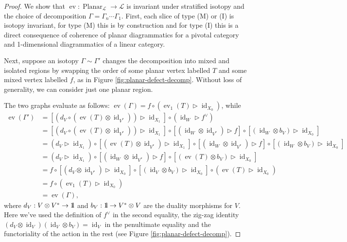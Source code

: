 \documentclass[a4paper]{article}
\numberwithin{equation}{section}
\newcommand{\idty}{{\mathrm{1}\mkern-4mu{\mathchoice{}{}{\mskip-0.5mu}{\mskip-1mu}}\mathrm{l}}}
\newcommand{\1}{{\mathrm{1}\mkern-4mu{\mathchoice{}{}{\mskip-0.5mu}{\mskip-1mu}}\mathrm{l}}}
\DeclareMathOperator{\ev}{ev}
\renewcommand{\L}{\mathcal{L}}
\DeclareMathOperator{\id}{id}
\DeclareMathOperator{\Planar}{Planar} %
\begin{document}
\begin{proof}
   We show that $\ev : \Planar_\L \to \L$ is invariant under stratified isotopy and the choice of decomposition $\Gamma = \Gamma_n \cdots \Gamma_1$. 
First, each slice of type (M) or (I) is isotopy invariant, for type (M) this is by construction and for type (I) this is a direct consequence of coherence of planar diagrammatics for a pivotal category and 1-dimensional diagrammatics of a linear category.

Next, suppose an isotopy $\Gamma \sim \Gamma'$ changes the decomposition into mixed and isolated regions by swapping the order of some planar vertex labelled $T$ and some mixed vertex labelled $f$, as in Figure \ref{fig:planar-defect-decomp}. Without loss of generality, we can consider just one planar region.

The two graphs evaluate as follows: $\ev(\Gamma) = f\circ\left(\ev_1(T)\triangleright \id_{X_0}\right)$, while
\begin{equation}
\begin{aligned}
  \ev(\Gamma') &= [(d_V\circ (\ev(T)\otimes \id_{V^*})) \triangleright \id_{X_1}] \circ (\id_{W}\triangleright f^\vee) \\
  &= [(d_V\circ(\ev(T)\otimes\id_{V^*}))\triangleright\id_{X_1}]\circ[(\id_W\otimes\id_{V^*})\triangleright f]\circ[(\id_{W}\otimes b_V)\triangleright\id_{X_0}] \\
  &= (d_V\triangleright\id_{X_1})\circ[(\ev(T)\otimes\id_{V^*})\triangleright\id_{X_1}] \circ [(\id_W\otimes\id_{V^*})\triangleright f]\circ[(\id_{W}\otimes b_V)\triangleright\id_{X_0}] \\
  &= (d_V\triangleright\id_{X_1})\circ[(\id_W\otimes\id_{V^*})\triangleright f]\circ[(\ev(T)\otimes b_V)\triangleright\id_{X_0}] \\
  &= f\circ [(d_V\otimes\id_{V^*})\triangleright\id_{X_0}]\circ[(\id_V\otimes b_V)\triangleright \id_{X_0}]\circ(\ev(T)\triangleright\id_{X_0}) \\
  &= f\circ\left(\ev_1(T)\triangleright \id_{X_0}\right)\\
  &=\ev(\Gamma),
\end{aligned}
\end{equation}
where $d_V : V\otimes V^* \to \idty $ and $b_V : \idty \to V^* \otimes V$ are the duality morphisms for $V$. Here we've used the definition of $f^\vee$ in the second equality, the zig-zag identity $(d_V\otimes \id_{V} )(\id_V\otimes b_V) = \id_V$ in the penultimate equality and the functoriality of the action in the rest (see Figure \ref{fig:planar-defect-decomp}).
\end{proof}
\end{document}
